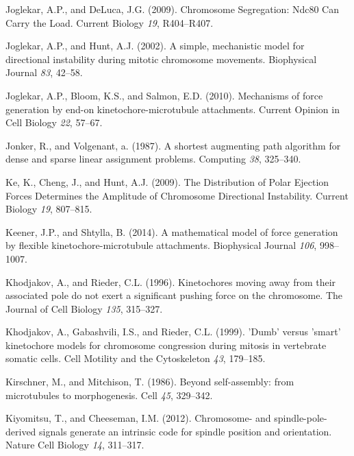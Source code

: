 \documentclass[12pt,a4paper,twoside,openright]{book}
\begin{document}
Joglekar, A.P., and DeLuca, J.G. (2009). Chromosome Segregation: Ndc80
Can Carry the Load. Current Biology \emph{19}, R404--R407.

Joglekar, A.P., and Hunt, A.J. (2002). A simple, mechanistic model for
directional instability during mitotic chromosome movements. Biophysical
Journal \emph{83}, 42--58.

Joglekar, A.P., Bloom, K.S., and Salmon, E.D. (2010). Mechanisms of
force generation by end-on kinetochore-microtubule attachments. Current
Opinion in Cell Biology \emph{22}, 57--67.

Jonker, R., and Volgenant, a. (1987). A shortest augmenting path
algorithm for dense and sparse linear assignment problems. Computing
\emph{38}, 325--340.

Ke, K., Cheng, J., and Hunt, A.J. (2009). The Distribution of Polar
Ejection Forces Determines the Amplitude of Chromosome Directional
Instability. Current Biology \emph{19}, 807--815.

Keener, J.P., and Shtylla, B. (2014). A mathematical model of force
generation by flexible kinetochore-microtubule attachments. Biophysical
Journal \emph{106}, 998--1007.

Khodjakov, A., and Rieder, C.L. (1996). Kinetochores moving away from
their associated pole do not exert a significant pushing force on the
chromosome. The Journal of Cell Biology \emph{135}, 315--327.

Khodjakov, A., Gabashvili, I.S., and Rieder, C.L. (1999). 'Dumb' versus
'smart' kinetochore models for chromosome congression during mitosis in
vertebrate somatic cells. Cell Motility and the Cytoskeleton \emph{43},
179--185.

Kirschner, M., and Mitchison, T. (1986). Beyond self-assembly: from
microtubules to morphogenesis. Cell \emph{45}, 329--342.

Kiyomitsu, T., and Cheeseman, I.M. (2012). Chromosome- and
spindle-pole-derived signals generate an intrinsic code for spindle
position and orientation. Nature Cell Biology \emph{14}, 311--317.
\end{document}

